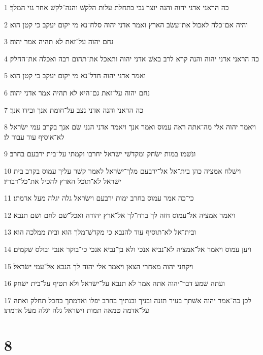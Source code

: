 \par 1 כה הראני אדני יהוה והנה יוצר גבי בתחלת עלות הלקשׁ והנה־לקשׁ אחר גזי המלך׃
\par 2 והיה אם־כלה לאכול את־עשׂב הארץ ואמר אדני יהוה סלח־נא מי יקום יעקב כי קטן הוא׃
\par 3 נחם יהוה על־זאת לא תהיה אמר יהוה׃
\par 4 כה הראני אדני יהוה והנה קרא לרב באשׁ אדני יהוה ותאכל את־תהום רבה ואכלה את־החלק׃
\par 5 ואמר אדני יהוה חדל־נא מי יקום יעקב כי קטן הוא׃
\par 6 נחם יהוה על־זאת גם־היא לא תהיה אמר אדני יהוה׃
\par 7 כה הראני והנה אדני נצב על־חומת אנך ובידו אנך׃
\par 8 ויאמר יהוה אלי מה־אתה ראה עמוס ואמר אנך ויאמר אדני הנני שׂם אנך בקרב עמי ישׂראל לא־אוסיף עוד עבור לו׃
\par 9 ונשׁמו במות ישׂחק ומקדשׁי ישׂראל יחרבו וקמתי על־בית ירבעם בחרב׃
\par 10 וישׁלח אמציה כהן בית־אל אל־ירבעם מלך־ישׂראל לאמר קשׁר עליך עמוס בקרב בית ישׂראל לא־תוכל הארץ להכיל את־כל־דבריו׃
\par 11 כי־כה אמר עמוס בחרב ימות ירבעם וישׂראל גלה יגלה מעל אדמתו׃
\par 12 ויאמר אמציה אל־עמוס חזה לך ברח־לך אל־ארץ יהודה ואכל־שׁם לחם ושׁם תנבא׃
\par 13 ובית־אל לא־תוסיף עוד להנבא כי מקדשׁ־מלך הוא ובית ממלכה הוא׃
\par 14 ויען עמוס ויאמר אל־אמציה לא־נביא אנכי ולא בן־נביא אנכי כי־בוקר אנכי ובולס שׁקמים׃
\par 15 ויקחני יהוה מאחרי הצאן ויאמר אלי יהוה לך הנבא אל־עמי ישׂראל׃
\par 16 ועתה שׁמע דבר־יהוה אתה אמר לא תנבא על־ישׂראל ולא תטיף על־בית ישׂחק׃
\par 17 לכן כה־אמר יהוה אשׁתך בעיר תזנה ובניך ובנתיך בחרב יפלו ואדמתך בחבל תחלק ואתה על־אדמה טמאה תמות וישׂראל גלה יגלה מעל אדמתו׃

\chapter{8}

